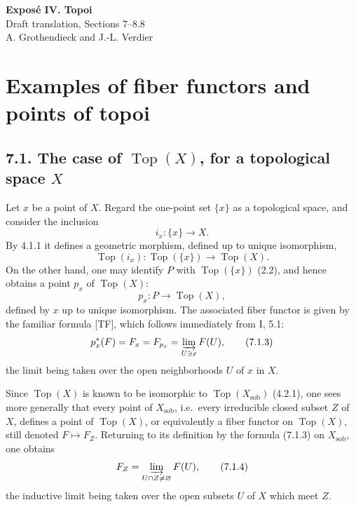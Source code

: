 \documentclass[11pt]{article}
\newcommand{\Top}{\operatorname{Top}}
\newcommand{\sob}{\operatorname{sob}}
\newcommand{\ie}{i.e.}
\begin{document}
\begin{center}
{\Large \textbf{Expos\'e IV. Topoi}}\\[0.35em]
{\large Draft translation, Sections 7--8.8}\\[0.35em]
A. Grothendieck and J.-L. Verdier
\end{center}

\bigskip


\setcounter{section}{6}
\section{Examples of fiber functors and points of topoi}

\subsection*{7.1. The case of \(\Top(X)\), for a topological space \(X\)}

Let \(x\) be a point of \(X\). Regard the one-point set \(\{x\}\) as a topological space, and consider the inclusion
\[
i_x:\{x\}\longrightarrow X.
\]
By 4.1.1 it defines a geometric morphism, defined up to unique isomorphism,
\begin{equation*}
\Top(i_x):\Top(\{x\})\longrightarrow\Top(X).\tag{7.1.1}
\end{equation*}
On the other hand, one may identify \(P\) with \(\Top(\{x\})\) (2.2), and hence obtains a point \(p_x\) of \(\Top(X)\):
\begin{equation*}
p_x:P\longrightarrow\Top(X),\tag{7.1.2}
\end{equation*}
defined by \(x\) up to unique isomorphism. The associated fiber functor is given by the familiar formula [TF], which follows immediately from I, 5.1:
\begin{equation*}
p_x^*(F)=F_x=F_{p_x}=\varinjlim_{U\ni x}F(U),\tag{7.1.3}
\end{equation*}
the limit being taken over the open neighborhoods \(U\) of \(x\) in \(X\).

Since \(\Top(X)\) is known to be isomorphic to \(\Top(X_{\sob})\) (4.2.1), one sees more generally that every point of \(X_{\sob}\), \ie\ every irreducible closed subset \(Z\) of \(X\), defines a point of \(\Top(X)\), or equivalently a fiber functor on \(\Top(X)\), still denoted \(F\mapsto F_Z\). Returning to its definition by the formula (7.1.3) on \(X_{\sob}\), one obtains
\begin{equation*}
F_Z=\varinjlim_{U\cap Z\ne\varnothing}F(U),\tag{7.1.4}
\end{equation*}
the inductive limit being taken over the open subsets \(U\) of \(X\) which meet \(Z\).
\end{document}
